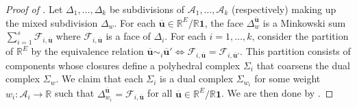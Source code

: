 \documentclass[11pt]{amsart}
\newcommand{\RR}{\mathbb R}
\newcommand{\bu}{{\mathbf u}}
\theoremstyle{definition}
\newcommand{\madeline}[1]{{\color{magenta} \sf  Madeline: [#1]}}
\newcommand{\leon}[1]{{\color{teal} \sf Leon: [#1]}}
\begin{document}

\begin{proof}[Proof of ]
Let $\Delta_1, \ldots, \Delta_k$ be subdivisions of $\mathcal A_1, \ldots, \mathcal A_k$ (respectively) making up the mixed subdivision $\Delta_w$. 
For each $\overline\bu\in \RR^E/\RR\mathbf 1$, the face $\Delta_w^{\overline\bu}$ is a Minkowski sum $\sum_{i=1}^s \mathcal F_{i,\overline\bu}$ where $\mathcal F_{i,\overline\bu}$ is a face of $\Delta_i$.  For each $i = 1, \ldots, k$, consider the partition of $\RR^E$ by the equivalence relation $\overline\bu\sim_i \overline\bu' \iff \mathcal F_{i,\overline\bu} = \mathcal F_{i,\overline\bu'}$.  This partition consists of components whose closures define a polyhedral complex $\Sigma_i$ that coarsens the dual complex  $\Sigma_w$.  
We claim that each $\Sigma_i$ is a dual complex $\Sigma_{w_i}$ for some weight $w_i: \mathcal A_i \to \RR$ such that $\Delta_{w_i}^{\overline\bu} = \mathcal F_{i,\overline\bu}$ for all $\overline\bu\in \RR^E/\RR\mathbf 1$.  We are then done by .


\end{proof}
\end{document}
